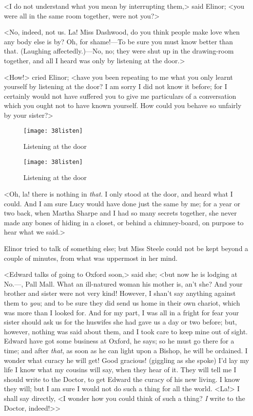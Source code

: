 <I do not understand what you mean by interrupting them,> said Elinor; <you were all in the same room together, were not you?>

<No, indeed, not us. La! Miss Dashwood, do you think people make love when any body else is by? Oh, for shame!—To be sure you must know better than that. (Laughing affectedly.)—No, no; they were shut up in the drawing-room together, and all I heard was only by listening at the door.>

<How!> cried Elinor; <have you been repeating to me what you only learnt yourself by listening at the door? I am sorry I did not know it before; for I certainly would not have suffered you to give me particulars of a conversation which you ought not to have known yourself. How could you behave so unfairly by your sister?>

\begin{a4}
	\begin{figure}[tbph]
		\centering
		\texttt{[image: 38listen]}
		\caption{Listening at the door}
	\end{figure}
\end{a4}


\begin{letter}
	\begin{figure}[tbph]
		\centering
		\texttt{[image: 38listen]}
		\caption{Listening at the door}
	\end{figure}
\end{letter}



<Oh, la! there is nothing in \textit{that}. I only stood at the door, and heard what I could. And I am sure Lucy would have done just the same by me; for a year or two back, when Martha Sharpe and I had so many secrets together, she never made any bones of hiding in a closet, or behind a chimney-board, on purpose to hear what we said.>

Elinor tried to talk of something else; but Miss Steele could not be kept beyond a couple of minutes, from what was uppermost in her mind.

<Edward talks of going to Oxford soon,> said she; <but now he is lodging at No.—, Pall Mall. What an ill-natured woman his mother is, an't she? And your brother and sister were not very kind! However, I shan't say anything against them to \textit{you}; and to be sure they did send us home in their own chariot, which was more than I looked for. And for my part, I was all in a fright for fear your sister should ask us for the huswifes she had gave us a day or two before; but, however, nothing was said about them, and I took care to keep mine out of sight. Edward have got some business at Oxford, he says; so he must go there for a time; and after \textit{that}, as soon as he can light upon a Bishop, he will be ordained. I wonder what curacy he will get! Good gracious! (giggling as she spoke) I'd lay my life I know what my cousins will say, when they hear of it. They will tell me I should write to the Doctor, to get Edward the curacy of his new living. I know they will; but I am sure I would not do such a thing for all the world. <La!> I shall say directly, <I wonder how you could think of such a thing? \textit{I} write to the Doctor, indeed!>>

